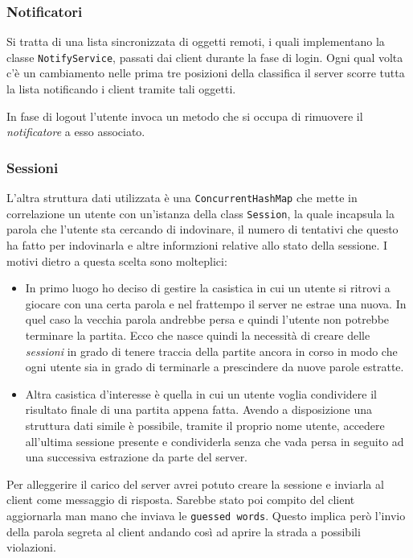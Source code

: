 \subsubsection{Notificatori}
Si tratta di una lista sincronizzata di oggetti remoti, i quali implementano la classe
\verb|NotifyService|, passati dai client durante la fase di login. Ogni qual volta c'è un
cambiamento nelle prima tre posizioni della classifica il server scorre tutta la lista notificando
i client tramite tali oggetti.

In fase di logout l'utente invoca un metodo che si occupa di rimuovere il \emph{notificatore}
a esso associato.

\subsubsection{Sessioni}
L'altra struttura dati utilizzata è una \verb|ConcurrentHashMap| che mette in correlazione un
utente con un'istanza della class \verb|Session|, la quale incapsula la parola che l'utente sta
cercando di indovinare, il numero di tentativi che questo ha fatto per indovinarla e altre
informzioni relative allo stato della sessione. I motivi dietro a questa scelta sono molteplici:
\begin{itemize}
	\item In primo luogo ho deciso di gestire la casistica in cui un utente si ritrovi a giocare
	      con una certa parola e nel frattempo il server ne estrae una nuova. In quel caso la
	      vecchia parola andrebbe persa e quindi l'utente non potrebbe terminare la partita. Ecco
	      che nasce quindi la necessità di creare delle \emph{sessioni} in grado di tenere
	      traccia della partite ancora in corso in modo che ogni utente sia in grado di
	      terminarle a prescindere da nuove parole estratte.
	\item Altra casistica d'interesse è quella in cui un utente voglia condividere il risultato
	      finale di una partita appena fatta. Avendo a disposizione una struttura dati simile è
	      possibile, tramite il proprio nome utente, accedere all'ultima sessione presente e
	      condividerla senza che vada persa in seguito ad una successiva estrazione da parte del
	      server.
\end{itemize}
Per alleggerire il carico del server avrei potuto creare la sessione e inviarla al client come
messaggio di risposta. Sarebbe stato poi compito del client aggiornarla man mano che inviava le
\verb|guessed words|. Questo implica però l'invio della parola segreta al client andando così ad
aprire la strada a possibili violazioni.

